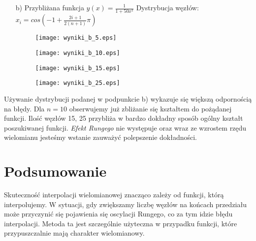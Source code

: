 \documentclass{article}
\begin{document}
\begin{enumerate}
    \item[b)] Przybliżana funkcja $y(x) = \frac{1}{1+50x^2}$ \qquad Dystrybucja węzłów: $x_i = cos( -1 + \frac{2i+1}{2(n+1)}\pi)$
    \begin{figure}[!ht]
      \begin{minipage}{0.5\textwidth}
        \centering
        \texttt{[image: wyniki\_b\_5.eps]}
      \end{minipage}
      \begin{minipage}{0.5\textwidth}
        \centering
        \texttt{[image: wyniki\_b\_10.eps]}
      \end{minipage}
    \end{figure}
    \begin{figure}[!ht]
      \begin{minipage}{0.5\textwidth}
        \centering
        \texttt{[image: wyniki\_b\_15.eps]}
      \end{minipage}
      \begin{minipage}{0.5\textwidth}
        \centering
        \texttt{[image: wyniki\_b\_25.eps]}
      \end{minipage}
    \end{figure}
  \end{enumerate}
  \newpage
  \begin{minipage}{\textwidth}
    Używanie dystrybucji podanej w podpunkcie b) wykazuje się większą odpornością na błędy. Dla $n = 10$ obserwujemy już zbliżanie się kształtem do pożądanej funkcji. Ilość węzłów 15, 25 przybliża w bardzo dokładny sposób ogólny kształt poszukiwanej funkcji. \textit{Efekt Rungego} nie występuje oraz wraz ze wzrostem rzędu wielomianu jesteśmy wstanie zauważyć polepszenie dokładności.
\end{minipage}

  \section{Podsumowanie}
  Skuteczność interpolacji wielomianowej znacząco zależy od funkcji, którą interpolujemy. W sytuacji, gdy zwiększamy liczbę węzłów na końcach przedziału może przyczynić się pojawienia się oscylacji Rungego, co za tym idzie błędu interpolacji. Metoda ta jest szczególnie użyteczna w przypadku funkcji, które przypuszczalnie mają charakter wielomianowy.
\end{document}
